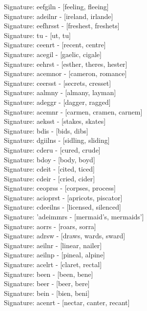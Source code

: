 Signature: {eefgiln} - [feeling, fleeing] \\
Signature: {adeilnr} - [ireland, irlande] \\
Signature: {eefhrsst} - [freshest, freshets] \\
Signature: {tu} - [ut, tu] \\
Signature: {ceenrt} - [recent, centre] \\
Signature: {acegil} - [gaelic, cigale] \\
Signature: {eehrst} - [esther, theres, hester] \\
Signature: {acemnor} - [cameron, romance] \\
Signature: {ceersst} - [secrets, cresset] \\
Signature: {aalmny} - [almany, layman] \\
Signature: {adeggr} - [dagger, ragged] \\
Signature: {acemnr} - [carmen, cramen, carnem] \\
Signature: {aeksst} - [stakes, skates] \\
Signature: {bdis} - [bids, dibs] \\
Signature: {dgiilns} - [sidling, sliding] \\
Signature: {cderu} - [cured, crude] \\
Signature: {bdoy} - [body, boyd] \\
Signature: {cdeit} - [cited, ticed] \\
Signature: {cdeir} - [cried, cider] \\
Signature: {ceoprss} - [corpses, process] \\
Signature: {acioprst} - [apricots, piscator] \\
Signature: {cdeeilns} - [licensed, silenced] \\
Signature: {'adeimmrs} - [mermaid's, mermaids'] \\
Signature: {aorrs} - [roars, sorra] \\
Signature: {adrsw} - [draws, wards, sward] \\
Signature: {aeilnr} - [linear, nailer] \\
Signature: {aeilnp} - [pineal, alpine] \\
Signature: {acelrt} - [claret, rectal] \\
Signature: {been} - [been, bene] \\
Signature: {beer} - [beer, bere] \\
Signature: {bein} - [bien, beni] \\
Signature: {acenrt} - [nectar, canter, recant] \\

